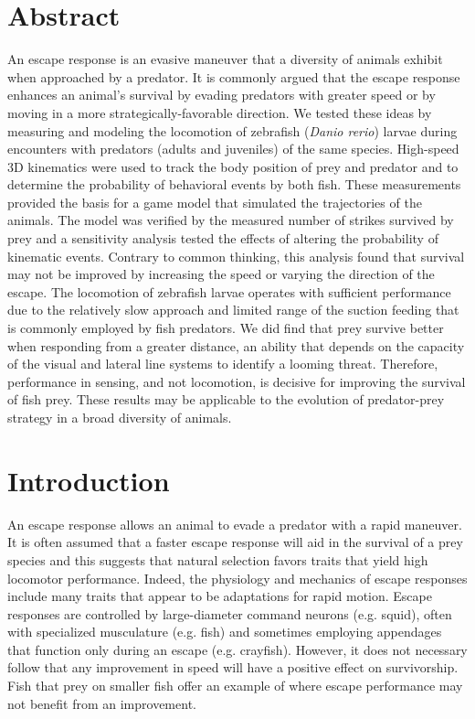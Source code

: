 \documentclass[]{rsos}%
\begin{document}
\section*{Abstract}
An escape response is an evasive maneuver that a diversity of animals exhibit when approached by a predator. 
It is commonly argued that the escape response enhances an animal's survival by evading predators with greater speed or by moving in a more strategically-favorable direction.
We tested these ideas by measuring and modeling the locomotion of zebrafish (\textit{Danio rerio}) larvae during encounters with predators (adults and juveniles) of the same species.
High-speed 3D kinematics were used to track the body position of prey and predator and to determine the probability of behavioral events by both fish.
These measurements provided the basis for a game model that simulated the trajectories of the animals. 
The model was verified by the measured number of strikes survived by prey and a sensitivity analysis tested the effects of altering the probability of kinematic events.
Contrary to common thinking, this analysis found that survival may not be improved by increasing the speed or varying the direction of the escape.
The locomotion of zebrafish larvae operates with sufficient performance due to the relatively slow approach and limited range of the suction feeding that is commonly employed by fish predators.
We did find that prey survive better when responding from a greater distance, an ability that depends on the capacity of the visual and lateral line systems to identify a looming threat.
Therefore, performance in sensing, and not locomotion, is decisive for improving the survival of fish prey.
These results may be applicable to the evolution of predator-prey strategy in a broad diversity of animals.


\section{Introduction}

An escape response allows an animal to evade a predator with a rapid maneuver. 
It is often assumed that a faster escape response will aid in the survival of a prey species and this suggests that natural selection favors traits that yield high locomotor performance.
Indeed, the physiology and mechanics of escape responses include many traits that appear to be adaptations for rapid motion.
Escape responses are controlled by large-diameter command neurons (e.g. squid), often with specialized musculature (e.g. fish) and sometimes employing appendages that function only during an escape (e.g. crayfish).
However, it does not necessary follow that any improvement in speed will have a positive effect on survivorship.
Fish that prey on smaller fish offer an example of where escape performance may not benefit from an improvement.
\end{document}
